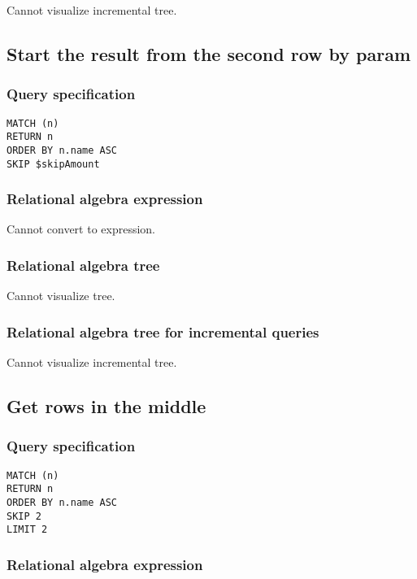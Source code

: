 Cannot visualize incremental tree.

\subsection{Start the result from the second row by param}

\subsubsection*{Query specification}

\begin{lstlisting}
MATCH (n)
RETURN n
ORDER BY n.name ASC
SKIP $skipAmount
\end{lstlisting}

\subsubsection*{Relational algebra expression}

Cannot convert to expression.

\subsubsection*{Relational algebra tree}

Cannot visualize tree.

\subsubsection*{Relational algebra tree for incremental queries}

Cannot visualize incremental tree.

\subsection{Get rows in the middle}

\subsubsection*{Query specification}

\begin{lstlisting}
MATCH (n)
RETURN n
ORDER BY n.name ASC
SKIP 2
LIMIT 2
\end{lstlisting}

\subsubsection*{Relational algebra expression}

